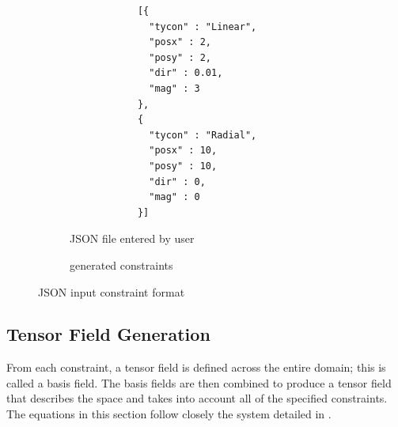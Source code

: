 \documentclass[twocolumn]{article}
\begin{document}
\begin{figure}[t!]
    \centering
    \vspace{10pt}
    \begin{subfigure}[b]{2.4in}
        \begin{verbatim}
            [{
              "tycon" : "Linear",
              "posx" : 2,
              "posy" : 2,
              "dir" : 0.01,
              "mag" : 3
            },
            {
              "tycon" : "Radial",
              "posx" : 10,
              "posy" : 10,
              "dir" : 0,
              "mag" : 0
            }]
        \end{verbatim}
        \caption{JSON file entered by user}
    \end{subfigure}
    \hspace{20pt}
    \begin{subfigure}[b]{2.4in}
        \vspace{3pt}
        \caption{generated constraints}
    \end{subfigure}
    \caption{JSON input constraint format}
\label{fig:json}
\end{figure}

\subsection{Tensor Field Generation}
From each constraint, a tensor field is defined across the entire domain; this
is called a basis field. The basis fields are then combined to produce a tensor
field that describes the space and takes into account all of the specified
constraints. The equations in this section follow closely the system detailed
in \cite{chen}.
\end{document}
